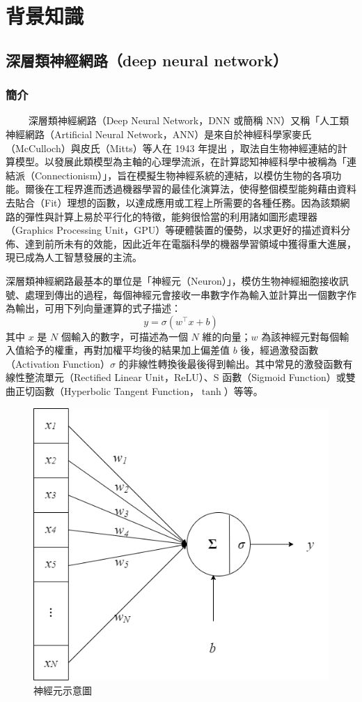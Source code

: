 
\chapter{背景知識}

\section{深層類神經網路（deep neural network）}

\subsection{簡介}  %
　　
深層類神經網路（Deep Neural Network，DNN 或簡稱 NN）又稱「人工類神經網路（Artificial Neural Network，ANN）是來自於神經科學家麥氏（McCulloch）與皮氏（Mitts）等人在 1943 年提出 \cite{mcculloch1943logical}，取法自生物神經連結的計算模型。以發展此類模型為主軸的心理學流派，在計算認知神經科學中被稱為「連結派（Connectionism）」，旨在模擬生物神經系統的連結，以模仿生物的各項功能。爾後在工程界進而透過機器學習的最佳化演算法，使得整個模型能夠藉由資料去貼合（Fit）理想的函數，以達成應用或工程上所需要的各種任務。因為該類網路的彈性與計算上易於平行化的特徵，能夠很恰當的利用諸如圖形處理器（Graphics Processing Unit，GPU）等硬體裝置的優勢，以求更好的描述資料分佈、達到前所未有的效能，因此近年在電腦科學的機器學習領域中獲得重大進展，現已成為人工智慧發展的主流。

深層類神經網路最基本的單位是「神經元（Neuron）」，模仿生物神經細胞接收訊號、處理到傳出的過程，每個神經元會接收一串數字作為輸入並計算出一個數字作為輸出，可用下列向量運算的式子描述：
$$y=\sigma(w^\top x + b) $$
其中 $x$ 是 $N$ 個輸入的數字，可描述為一個 $N$ 維的向量；$w$ 為該神經元對每個輸入值給予的權重，再對加權平均後的結果加上偏差值 $b$ 後，經過激發函數（Activation Function）$\sigma$ 的非線性轉換後最後得到輸出。其中常見的激發函數有線性整流單元（Rectified Linear Unit，ReLU）、S 函數（Sigmoid Function）或雙曲正切函數（Hyperbolic Tangent Function，$\tanh$）等等。

\begin{figure}
    \centering
    \includegraphics[width=0.5\linewidth]{figures/neuron.drawio.png}
    \caption{神經元示意圖}
    \label{fig:single-neuron}
\end{figure}

